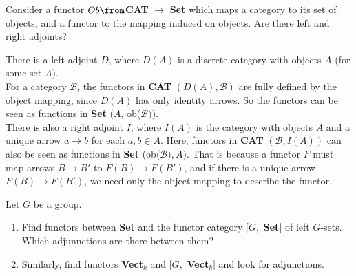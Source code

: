 	\begin{exercise}
		Consider a functor $Ob \from $\textbf {CAT }$  \to $\textbf { Set} which maps a category to its set of objects, and a functor to the mapping induced on objects. Are there left and right adjoints?
	\end{exercise}
	
	\begin{answer}
		There is a left adjoint $D$, where $D(A)$ is a discrete category with objects $A$ (for some set $A$). \\
		For a category $\mathscr{B}$, the functors in \textbf{CAT} $(D(A), \mathscr{B})$ are fully defined by the object mapping, since $D(A)$ has only identity arrows. So the functors can be seen as functions in \textbf{Set} $(A$, ob($\mathscr{B}))$.
		\\There is also a right adjoint $I$, where $I(A)$ is the category with objects $A$ and a unique arrow $a \to b$ for each $a,b \in A$. Here, functors in \textbf{CAT} $(\mathscr{B}, I(A))$ can also be seen as functions in \textbf{Set} (ob($\mathscr{B}), A)$. That is because a functor $F$ must map arrows $B \to B'$ to $F(B) \to F(B')$, and if there is a unique arrow $F(B) \to F(B')$, we need only the object mapping to describe the functor.
	\end{answer}
	
	\begin{exercise}
		Let $G$ be a group. \begin{enumerate}
			\item Find functors between \textbf{Set} and the functor category $[G,$ \textbf{Set}$]$ of left $G$-sets. Which adjunnctions are there between them?
			\item Similarly, find functors \textbf{Vect}$_k$ and $[G,$ \textbf{Vect}$_k]$ and look for adjunctions.
		\end{enumerate}
	\end{exercise}
	
